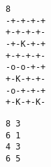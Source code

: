 \begin{verbatim}
8
-+-+-+-+
+-+-+-+-
-+-K-+-+
+-+-+-+-
-o-o-+-+
+-K-+-+-
-o-+-+-+
+-K-+-K-
\end{verbatim}
\begin{verbatim}
8 3
6 1
4 3
6 5
\end{verbatim}